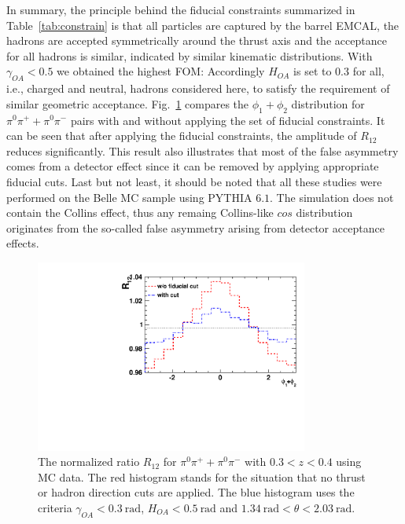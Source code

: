 In summary, the principle behind the fiducial constraints summarized in Table~\ref{tab:constrain} is that all particles are captured by the barrel EMCAL, the hadrons are accepted symmetrically around the thrust axis and the acceptance for all hadrons is similar,  indicated by similar kinematic distributions. With $\gamma_{OA}<0.5$ we obtained the highest FOM: Accordingly $H_{OA}$ is set to 0.3 for all, i.e., charged and neutral, hadrons considered here, to satisfy the requirement of similar geometric acceptance. Fig.~\ref{fig:differentthetarange} compares the $\phi_1+\phi_2$ distribution for $\pi^0\pi^++\pi^0\pi^-$ pairs with and without applying the set of fiducial constraints. It can be seen that after applying the fiducial constraints, the amplitude of $R_{12}$ reduces significantly. This result also illustrates that  most of the false asymmetry comes from a detector effect since it can be removed by applying appropriate fiducial cuts. Last but not least, it should be noted that all these studies were performed on the Belle MC sample using PYTHIA $6.1$. The simulation does not contain the Collins effect, thus any remaing Collins-like $cos$ distribution originates from  the so-called false asymmetry arising from detector acceptance effects. 
\begin{figure}[h]
    \centering
    \includegraphics[width=0.8\textwidth,natwidth=610,natheight=642]{figure_dataselection/DetectorEffect.pdf}
    \caption{The normalized ratio $R_{12}$ for $\pi^0\pi^++\pi^0\pi^-$ with $0.3<z<0.4$ using MC data. The red histogram stands for the situation that no thrust or hadron direction cuts are applied. The blue histogram uses the criteria $\gamma_{OA} <0.3~\text{rad}$, $H_{OA}<0.5~\text{rad}$ and $1.34~\text{rad}<\theta<2.03~\text{rad}$.}
    \label{fig:differentthetarange}
\end{figure}


